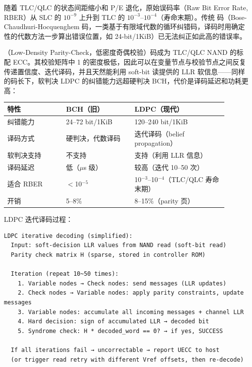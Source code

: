 
随着 TLC/QLC 的状态间距缩小和 P/E 退化，原始误码率（Raw Bit Error Rate, RBER）从 SLC 的 $10^{-9}$ 上升到 TLC 的 $10^{-3}$--$10^{-4}$（寿命末期）。传统  码（Bose-Chaudhuri-Hocquenghem 码，一类基于有限域代数的循环纠错码，译码时用确定性的代数方法一步算出错误位置，如 24-bit/1KiB）已无法纠正如此高的错误率。

（Low-Density Parity-Check，低密度奇偶校验）码成为 TLC/QLC NAND 的标配 ECC。其校验矩阵中 1 的密度极低，因此可以在变量节点与校验节点之间反复传递置信度、迭代译码，并且天然能利用 soft-bit 读提供的 LLR 软信息——同样的码长下，软判决 LDPC 的纠错能力远超硬判决 BCH，代价是译码延迟和功耗更高：

\begin{longtable}{L{0.24\linewidth}L{0.28\linewidth}L{0.38\linewidth}}
\toprule
特性 & BCH（旧） & LDPC（现代） \\
\midrule
纠错能力 & 24--72 bit/1KiB & 120--240 bit/1KiB \\
译码方式 & 硬判决，代数译码 & 迭代译码（belief propagation） \\
软判决支持 & 不支持 & 支持（利用 LLR 信息） \\
译码延迟 & 低（$\mu$s 级） & 较高（迭代 10--50 次） \\
适合 RBER & $<$10$^{-5}$ & 10$^{-3}$--10$^{-4}$（TLC/QLC 寿命末期） \\
开销 & 5--8\% & 8--15\%（parity 页） \\
\bottomrule
\end{longtable}

LDPC 迭代译码过程：

\begin{lstlisting}
LDPC iterative decoding (simplified):
  Input: soft-decision LLR values from NAND read (soft-bit read)
  Parity check matrix H (sparse, stored in controller ROM)

  Iteration (repeat 10~50 times):
    1. Variable nodes → Check nodes: send messages (LLR updates)
    2. Check nodes → Variable nodes: apply parity constraints, update messages
    3. Variable nodes: accumulate all incoming messages + channel LLR
    4. Hard decision: sign of accumulated LLR → decoded bit
    5. Syndrome check: H * decoded_word == 0? → if yes, SUCCESS

  If all iterations fail → uncorrectable → report UECC to host
  (or trigger read retry with different Vref offsets, then re-decode)
\end{lstlisting}

